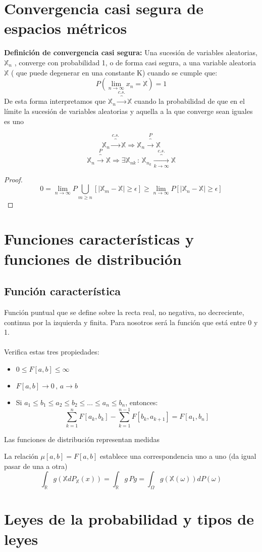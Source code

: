 \documentclass[12pt,a4paper]{book}
\begin{document}
\section{Convergencia casi segura de espacios métricos}
\textbf{Definición de convergencia casi segura:} Una sucesión de variables aleatorias, ${ \mathbb{X}_n }$ , converge con probabilidad 1, o de forma casi segura, a una variable aleatoria $\mathbb{X}$ ( que puede degenerar en una constante K) cuando se cumple que:
$$P(\lim_{n\rightarrow\infty}x_n=\mathbb{X})=1$$
De esta forma interpretamos que $\mathbb{X}_n\overbrace{\longrightarrow}^{c.s.}\mathbb{X}$ cuando la probabilidad de que en el límite la sucesión de variables  aleatorias y aquella a la que converge sean iguales es uno

\begin{theorem}
$$\mathbb{X}_n\overbrace{\longrightarrow}^{c.s.}\mathbb{X}\Longrightarrow \mathbb{X}_n\overbrace{\longrightarrow}^P\mathbb{X}$$
$$\mathbb{X}_n\overbrace{\longrightarrow}^P\mathbb{X}\Longrightarrow \exists\mathbb{X}_{nk}\,:\, \mathbb{X}_{n_k}\overbrace{\longrightarrow}^{c.s.}_{k\rightarrow\infty}\mathbb{X}$$
\end{theorem}
\begin{proof}
$$0=\displaystyle\lim_{n\rightarrow\infty}P\bigcup_{m\geq n}[|\mathbb{X}_m - \mathbb{X}|\geq \epsilon ]\geq\displaystyle\lim_{n\rightarrow\infty}P[|\mathbb{X}_n - \mathbb{X}|\geq \epsilon ]$$
\end{proof}
\section{Funciones características y funciones de distribución}
\subsection{Función característica}
Función puntual que se define sobre la recta real, no negativa, no decreciente, continua por la izquierda y finita. Para nosotros será la función que está entre 0 y 1.
\\\\
Verifica estas tres propiedades:
\begin{itemize}
\item $0\leq F[a,b]\leq \infty$
\item $F[a,b]\rightarrow 0 \, , \, a\rightarrow b$
\item Si $a_1\leq b_1\leq a_2\leq b_2\leq\ldots\leq a_n \leq b_n$, entonces:
$$\sum_{k=1}^n F[a_k,b_k]-\sum_{k=1}^{n-1}F[b_k,a_{k+1}]=F[a_1,b_n]$$
\end{itemize}
Las funciones de distribución representan medidas
\begin{theorem}
La relación $\mu[a,b]=F[a,b]$ establece una correspondencia uno a uno (da igual pasar de una a otra)
$$\int_\mathbb{R} g(\mathbb{X}dP_{\mathbb{X}}(x))=\int_\mathbb{R} g\, Pg=\int_{\Omega}g(\mathbb{X}(\omega))dP(\omega)$$
\end{theorem}

\section{Leyes de la probabilidad y tipos de leyes}
\end{document}

